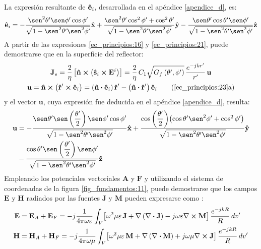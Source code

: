 La expresión resultante de $\bm{\mathbf{\hat{e}}}_i$, desarrollada en el apéndice \ref{apendice_d}, es:
\begin{align}
\versor{e}_i= -\dfrac{\sen^2\theta '\sen\phi '\cos\phi '}{\sqrt{1 - \sen^2\theta '\sen^2\phi '}}\versor{x} + \dfrac{\sen^2\theta '\cos^2\phi ' + \cos^2\theta'}{\sqrt{1 - \sen^2\theta '\sen^2\phi '}}\versor{y} - \dfrac{\sen\theta '\cos\theta '\sen\phi '}{\sqrt{1 - \sen^2\theta '\sen^2\phi '}}\versor{z}
\label{ec_principios:23}
\end{align}
A partir de las expresiones \eqref{ec_principios:16} y \eqref{ec_principios:21}, puede demostrarse que en la superficie del reflector:
\begin{gather}
\mathbf{J}_s = \dfrac{2}{\eta}\left[\versor{n}\prodvec\left(\versor{s}_i\prodvec\mathbf{E}^i\right)\right] = \dfrac{2}{\eta}\,C_1\sqrt{G_f\left(\theta ',\phi '\right)}\,\frac{e^{-jkr'}}{r'}\,\mathbf{u}
\label{ec_principios:24}\\
\mathbf{u} = \versor{n}\prodvec\left(\versor{r}'\prodvec\versor{e}_i\right) = \left(\versor{n}\prodesc\versor{e}_i\right)\versor{r}' - \left(\versor{n}\prodesc\versor{r}'\right)\versor{e}_i
\tag{\ref{ec_principios:23}a}
\label{ec_principios:25}
\end{gather}
y el vector $\mathbf{u}$, cuya expresión fue deducida en el apéndice \ref{apendice_d}, resulta:
\begin{align}
\begin{split}
\mathbf{u} &= -\dfrac{\sen\theta '\sen\left(\dfrac{\theta '}{2}\right)\sen\phi '\cos\phi '}{\sqrt{1 - \sen^2\theta '\sen^2\phi '}}\versor{x} + \dfrac{\cos\left(\dfrac{\theta '}{2}\right)\!\left(\cos\theta '\sen^2\phi ' + \cos^2\phi '\right)}{\sqrt{1 - \sen^2\theta '\sen^2\phi '}}\versor{y}\\
&-\dfrac{\cos\theta '\sen\left(\dfrac{\theta '}{2}\right)\sen\phi '}{\sqrt{1 - \sen^2\theta '\sen^2\phi '}}\versor{z}
\label{ec_principios:26}
\end{split}
\end{align}
Empleando los potenciales vectoriales $\mathbf{A}$ y $\mathbf{F}$ y utilizando el sistema de coordenadas de la figura \ref{fig_fundamentos:11}, puede demostrarse que los campos $\mathbf{E}$ y $\mathbf{H}$ radiados por las fuentes $\mathbf{J}$ y $\mathbf{M}$ pueden expresarse como \cite{Silver}:
\begin{subequations}
\label{grup_ec_principios:2}
\begin{align}
\mathbf{E} &= \mathbf{E}_A + \mathbf{E}_F = -j\frac{1}{4\pi\omega\varepsilon}\int_{V}\!\left[\omega^2\mu\varepsilon\,\mathbf{J} + \nabla\left(\nabla\boldsymbol{\cdot}\mathbf{\mathbf{J}}\right) - j\omega\varepsilon\nabla\boldsymbol{\times}\mathbf{M}\right]\frac{e^{- jkR}}{R}\,dv'
\label{ec_principios:27}\\
\mathbf{H} &= \mathbf{H}_A + \mathbf{H}_F = -j\frac{1}{4\pi\omega\mu}\int_{V}\!\left[\omega^2\mu\varepsilon\,\mathbf{M} + \nabla\left(\nabla\boldsymbol{\cdot}\mathbf{\mathbf{M}}\right) + j\omega\mu\nabla\boldsymbol{\times}\mathbf{J}\right]\frac{e^{- jkR}}{R}\,dv'
\label{ec_principios:28}
\end{align}
\end{subequations}
